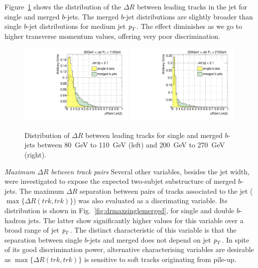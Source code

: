 Figure~\ref{fig:drtrk12singlemerged} shows the distribution of the $\Delta R$ between leading tracks in the jet for single and merged $b$-jets. The merged $b$-jet distributions are slightly broader than single $b$-jet distributions for medium jet ${\emph{p}_{T}}$. The effect diminishes as we go to higher transverse momentum values, offering very poor discrimination.

\begin{figure}[tp]
\centering
\includegraphics[width=0.49\textwidth]{FIGS/VarsSingleMerged/DRtrk12080.pdf}
\includegraphics[width=0.49\textwidth]{FIGS/VarsSingleMerged/DRtrk12200.pdf}
\caption{Distribution of $\Delta R$ between leading tracks for single and merged $b$-jets between 80~GeV to 110~GeV (left) and 200~GeV to 270~GeV (right).}
\label{fig:drtrk12singlemerged}
\end{figure}


{ \em Maximum $\Delta R$ between track pairs}  Several other variables, besides the jet width, were investigated to expose the expected two-subjet substructure of merged $b$-jets.  The maximum $\Delta R$ separation between pairs of tracks associated to the jet ($\max\{\Delta R(trk,trk)\}$) was also evaluated as a discrimating variable. Its distribution is shown in Fig.~\ref{fig:drmaxsinglemerged}, for single and double $b$-hadron jets. The latter show significantly higher values for this variable over a broad range of jet ${\emph{p}_{T}}$. The distinct characteristic of this variable is that the separation between single $b$-jets and merged does not depend on jet ${\emph{p}_{T}}$. In spite of its good discrimination power, alternative characterising variables are desirable as $\max\{\Delta R(trk,trk)\}$ is sensitive to soft tracks originating from pile-up. 

